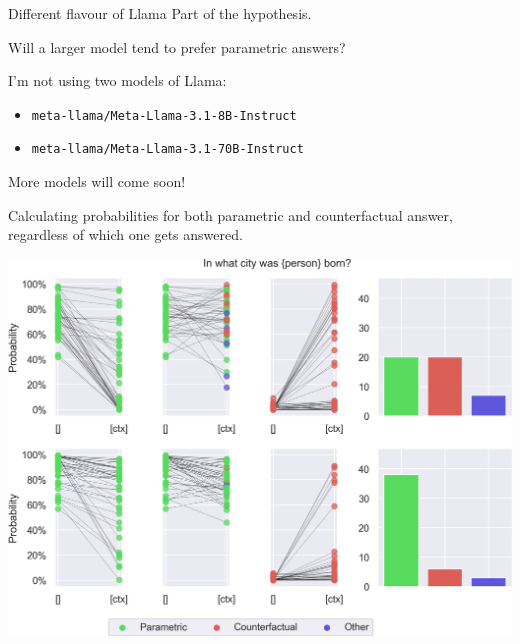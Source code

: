 \documentclass[9pt]{beamer}
\begin{document}
\begin{frame}{Different flavour of Llama}
	Part of the hypothesis\footnotemark{}.

	\vfill{}

	\begin{center}
		\begin{Large}
			Will a larger model tend to prefer parametric answers?
		\end{Large}
	\end{center}

	\vfill{}

	I'm not using two models of Llama:
	\begin{itemize}
		\item \texttt{meta-llama/Meta-Llama-3.1-8B-Instruct}
		\item \texttt{meta-llama/Meta-Llama-3.1-70B-Instruct}
	\end{itemize}

	More models will come soon!

\end{frame}

\begin{frame}
	Calculating probabilities for both parametric and counterfactual answer, regardless of which one gets answered.

	\vfill{}

	\centering
	\includegraphics[width=.8\textwidth]{../figures/llama_47.png}
\end{frame}
\end{document}
